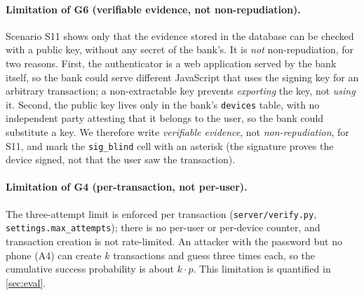 \paragraph{Limitation of G6 (verifiable evidence, not non-repudiation).}
Scenario S11 shows only that the evidence stored in the database can be checked
with a public key, without any secret of the bank's. It is \emph{not}
non-repudiation, for two reasons. First, the authenticator is a web application
served by the bank itself, so the bank could serve different JavaScript that uses
the signing key for an arbitrary transaction; a non-extractable key prevents
\emph{exporting} the key, not \emph{using} it. Second, the public key lives only
in the bank's \texttt{devices} table, with no independent party attesting that it
belongs to the user, so the bank could substitute a key. We therefore write
\emph{verifiable evidence}, not \emph{non-repudiation}, for S11, and mark the
\texttt{sig\_blind} cell with an asterisk (the signature proves the device
signed, not that the user saw the transaction).

\paragraph{Limitation of G4 (per-transaction, not per-user).}
The three-attempt limit is enforced per transaction (\texttt{server/verify.py},
\texttt{settings.max\_attempts}); there is no per-user or per-device counter, and
transaction creation is not rate-limited. An attacker with the password but no
phone (A4) can create $k$ transactions and guess three times each, so the
cumulative success probability is about $k\cdot p$. This limitation is quantified
in \cref{sec:eval}.
